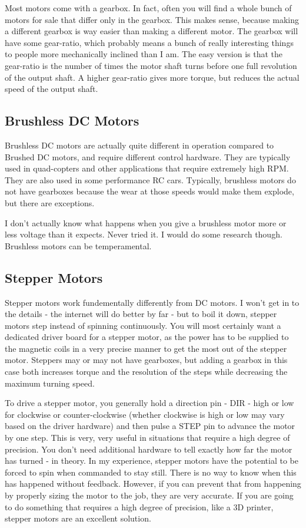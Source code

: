 Most motors come with a gearbox. In fact, often you will find a whole bunch of motors for sale that differ only in the gearbox. This makes sense, because making a different gearbox is way easier than making a different motor. The gearbox will have some gear-ratio, which probably means a bunch of really interesting things to people more mechanically inclined than I am. The easy version is that the gear-ratio is the number of times the motor shaft turns before one full revolution of the output shaft. A higher gear-ratio gives more torque, but reduces the actual speed of the output shaft.

\subsection{Brushless DC Motors}

Brushless DC motors are actually quite different in operation compared to Brushed DC motors, and require different control hardware. They are typically used in quad-copters and other applications that require extremely high RPM. They are also used in some performance RC cars. Typically, brushless motors do not have gearboxes because the wear at those speeds would make them explode, but there are exceptions.

I don't actually know what happens when you give a brushless motor more or less voltage than it expects. Never tried it. I would do some research though. Brushless motors can be temperamental.

\subsection{Stepper Motors}

Stepper motors work fundementally differently from DC motors. I won't get in to the details - the internet will do better by far - but to boil it down, stepper motors step instead of spinning continuously. You will most certainly want a dedicated driver board for a stepper motor, as the power has to be supplied to the magnetic coils in a very precise manner to get the most out of the stepper motor. Steppers may or may not have gearboxes, but adding a gearbox in this case both increases torque and the resolution of the steps while decreasing the maximum turning speed.

To drive a stepper motor, you generally hold a direction pin - DIR - high or low for clockwise or counter-clockwise (whether clockwise is high or low may vary based on the driver hardware) and then pulse a STEP pin to advance the motor by one step. This is very, very useful in situations that require a high degree of precision. You don't need additional hardware to tell exactly how far the motor has turned - in theory. In my experience, stepper motors have the potential to be forced to spin when commanded to stay still. There is no way to know when this has happened without feedback. However, if you can prevent that from happening by properly sizing the motor to the job, they are very accurate. If you are going to do something that requires a high degree of precision, like a 3D printer, stepper motors are an excellent solution.

